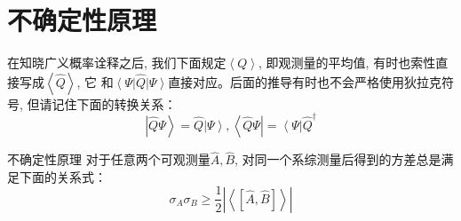 \documentclass[a4paper,zihao=-4,linespread=1]{ctexrep}
\begin{document}
    \section{不确定性原理}
    在知晓广义概率诠释之后, 我们下面规定$\left\langle Q \right\rangle$, 即观测量的平均值, 有时也索性直接写成$\left\langle \hat Q \right\rangle$, 它
    和$\left\langle \Psi \right| \hat{Q}  \left| \Psi  \right\rangle$直接对应。后面的推导有时也不会严格使用狄拉克符号, 但请记住下面的转换关系：
    \[\left|\hat Q\Psi\right\rangle=\hat Q\left|\Psi\right\rangle, \left\langle \hat Q \Psi\right|=\left\langle \Psi\right|\hat{Q}^\dagger\]
    \begin{theorem}{不确定性原理}
        对于任意两个可观测量$\hat{A}, \hat{B}$, 对同一个系综测量后得到的方差总是满足下面的关系式：
        \begin{equation}
            \label{不确定性原理}
            \boxed{
                \sigma_A\sigma_B\geq\frac{1}{2}\left|\left\langle\left[\hat A,\hat B\right]\right\rangle\right|
            }
        \end{equation}
    \end{theorem}
\end{document}
